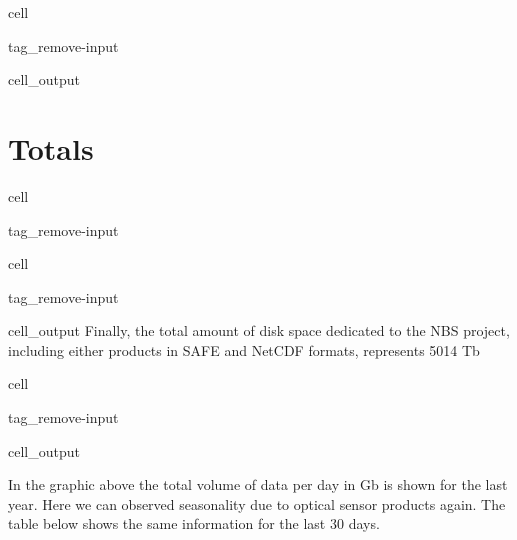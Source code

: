 \documentclass[letterpaper,10pt,english]{jupyterBook}
\begin{document}
\begin{sphinxuseclass}{cell}
\begin{sphinxuseclass}{tag_remove-input}\begin{sphinxVerbatimOutput}

\begin{sphinxuseclass}{cell_output}
\noindent{}

\end{sphinxuseclass}\end{sphinxVerbatimOutput}

\end{sphinxuseclass}
\end{sphinxuseclass}

\section{Totals}
\label{\detokenize{volumes:totals}}
\begin{sphinxuseclass}{cell}
\begin{sphinxuseclass}{tag_remove-input}
\end{sphinxuseclass}
\end{sphinxuseclass}
\begin{sphinxuseclass}{cell}
\begin{sphinxuseclass}{tag_remove-input}\begin{sphinxVerbatimOutput}

\begin{sphinxuseclass}{cell_output}
\sphinxAtStartPar
Finally, the total amount of disk space dedicated to the NBS project, including either products in SAFE and NetCDF formats, represents 5014 Tb

\end{sphinxuseclass}\end{sphinxVerbatimOutput}

\end{sphinxuseclass}
\end{sphinxuseclass}
\begin{sphinxuseclass}{cell}
\begin{sphinxuseclass}{tag_remove-input}\begin{sphinxVerbatimOutput}

\begin{sphinxuseclass}{cell_output}
\noindent{}

\end{sphinxuseclass}\end{sphinxVerbatimOutput}

\end{sphinxuseclass}
\end{sphinxuseclass}
\sphinxAtStartPar
In the graphic above the total volume of data per day in Gb is shown for the last year. Here we can observed seasonality due to optical sensor products again. The table below shows the same information for the last 30 days.
\end{document}
